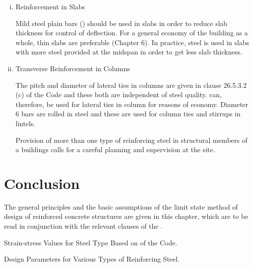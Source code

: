 \begin{enumerate}[(i)]
\item Reinforcement in Slabs

Mild steel plain bars (\fetwofivezero) should be used in slabs in order
to reduce slab thickness for control of deflection. For a general
economy of the building as a whole, thin slabs are preferable
(Chapter 6). In practice, {\fefouronefive} steel is used in slabs with
more steel provided at the midspan in order to get less slab thickness.

\item Transverse Reinforcement in Columns

The pitch and diameter of lateral ties in columns are given in clause
26.5.3.2 (c) of the Code and these both are independent of steel quality.
{\fetwofivezero} can, therefore, be used for lateral ties in column for
reasons of economy. Diameter 6 {\mm} bars are rolled in {\fetwofivezero}
steel and these are used for column ties and stirrups in lintels.


Provision of more than one type of reinforcing steel in structural
members of a buildings calls for a careful planning and supervision at
the site.
\end{enumerate}

\section{Conclusion}
The general principles and the basic assumptions of the limit state
method of design of reinforced concrete structures are given in this
chapter, which are to be read in conjunction with the relevant clauses
of the .

\begin{table}
\centering
\caption{Strain-stress Values for Steel Type {\fefouronefive} Based on
 of the Code.}
\label{stress-strain-values-table}
\end{table}
\begin{table}
\centering
{}
\caption{Design Parameters for Various Types of Reinforcing Steel.}
\label{reinforcing-steel-table}
\end{table}
